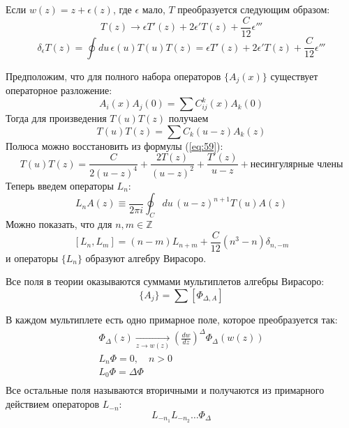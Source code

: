 \documentclass[a4paper,12pt]{article}
\theoremstyle{definition} \newtheorem{Def}{Definition}
\begin{document}
Если $w(z)=z+\epsilon(z)$, где $\epsilon$ мало, $T$ преобразуется следующим образом:
\begin{equation}
  \label{eq:58}
  T(z)\to \epsilon T'(z) + 2\epsilon' T(z)+\frac{C}{12}\epsilon'''
\end{equation}
\begin{equation}
  \label{eq:59}
  \delta_{\epsilon}T(z)=\oint du\, \epsilon(u) T(u) T(z) = \epsilon T'(z) + 2\epsilon' T(z)+\frac{C}{12}\epsilon'''
\end{equation}

Предположим, что для полного набора операторов  $\{A_j(x)\}$ существует операторное разложение:
\begin{equation}
  \label{eq:60}
  A_i(x)A_j(0)=\sum C^k_{ij}(x)A_k(0)
\end{equation}
Тогда для произведения $T(u)T(z)$ получаем
\begin{equation}
  \label{eq:61}
  T(u)T(z)=\sum C_k(u-z) A_k(z)
\end{equation}
Полюса можно восстановить из формулы (\ref{eq:59}):
\begin{equation}
  \label{eq:62}
  T(u)T(z)=\frac{C}{2(u-z)^4}+\frac{2T(z)}{(u-z)^2}+\frac{T'(z)}{u-z}+\mbox{несингулярные члены}
\end{equation}
Теперь введем операторы $L_n$:
\begin{equation}
  \label{eq:63}
  L_n A(z)\equiv \frac{}{2\pi i}\oint_{C}du\, (u-z)^{n+1}T(u)A(z)
\end{equation}
Можно показать, что для $n,m\in \mathbb{Z}$
\begin{equation}
  \label{eq:64}
  [L_n,L_m]=(n-m) L_{n+m}+\frac{C}{12}(n^3-n)\delta_{n,-m}
\end{equation}
и операторы $\{L_n\}$ образуют алгебру Вирасоро.

Все поля в теории оказываются суммами мультиплетов алгебры Вирасоро:
\begin{equation}
  \label{eq:65}
  \{A_j\}=\sum [\Phi_{\Delta,A}] %
\end{equation}

В каждом мультиплете есть одно примарное поле, которое преобразуется так:
\begin{equation}
  \label{eq:66}
  \begin{split}
    \Phi_{\Delta}(z)\underset{z\to w(z)}{\longrightarrow} \left(\frac{dw}{dz}\right)^{\Delta}\Phi_{\Delta}(w(z))\\
    L_n \Phi=0,\quad n>0\\
    L_0 \Phi=\Delta \Phi\\
  \end{split}
\end{equation}
Все остальные поля называются вторичными и получаются из примарного действием операторов $L_{-n}$:
\begin{equation}
  \label{eq:67}
  L_{-n_1}L_{-n_2}\dots \Phi_{\Delta}
\end{equation}
\end{document}
